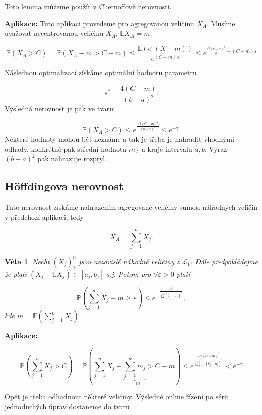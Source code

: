 \documentclass{article}
\newtheorem{theorem}[subsubsection]{Věta}
\theoremstyle{remark}
\theoremstyle{plain}
\theoremstyle{definition}
\theoremstyle{remark}
\begin{document}
Toto lemma můžeme použít v Chernoffově nerovnosti.

\textbf{Aplikace:}
Tuto aplikaci provedeme pro agregovanou veličinu $X_A$. Musíme uvažovat necentrovanou veličinu $X_A$, $\mathbb{E}X_A = m$.

$$
\mathbb{P}\left(X_A > C \right) = \mathbb{P}\left( X_A - m > C - m \right) \leq \frac{\mathbb{E} \left( e^s\left(X-m\right) \right)}{e^{\left(C-m\right)s}} \leq e^{\frac{s^2 \left(b-a\right)^2}{8} - \left(C-m\right)s}
$$

Následnou optimalizací získáme optimální hodnotu parametru

$$
s^{*} = \frac{4\left(C-m\right)}{\left(b-a\right)^2}.
$$
Výsledná nerovnost je pak ve tvaru

$$
\mathbb{P}\left(X_A > C \right) \leq e^{\frac{-2\left(C-m\right)^2}{\left(b-a\right)^2}} \leq e^{-\gamma}.
$$
Některé hodnoty mohou být neznáme a tak je třeba je nahradit vhodnými odhady, konkrétně pak střední hodnotu $\hat{m_A}$ a kraje intervalu $\hat{a}, \hat{b}$. Výraz $\left(b-a\right)^2$ pak nahrazuje rozptyl.

\subsection{H\"offdingova nerovnost}
Tuto nerovnost získáme nahrazením agregované veličiny sumou náhodných veličin v předchozí aplikaci, tedy

$$
X_A = \sum_{j=1}^n X_j.
$$

\begin{theorem}
Nechť $\left(X_j\right)_1^n$ jsou nezávislé náhodné veličiny z $\mathscr{L}_1$. Dále předpokládejme že platí $\left( X_j - \mathbb{E}X_j \right) \in \left[a_j,b_j\right]$ s.j. Potom pro $\forall \varepsilon > 0$ platí 

$$
\mathbb{P}\left(\sum_{j=1}^n X_j - m \geq \varepsilon \right) \leq e^{-\frac{2\varepsilon^2}{\sum \left(b_j-a_j\right)^2}},
$$
kde $m = \mathbb{E}\left(\sum_{j=1}^n X_j\right)$
\end{theorem}

\textbf{Aplikace:}

$$
\mathbb{P}\left(\sum_{j=1}^{n} X_j > C \right) = \mathbb{P}\left(\sum_{j=1}^{n} X_j - \underbrace{\sum_{j=1}^{n} m_j}_{=m} > C - m \right) \leq e^{\frac{-2\left(C-m\right)^2}{\sum_{j=1}^{n}\left(b_j-a_j\right)^2}} < e^{-\gamma}
$$

Opět je třeba odhadnout některé veličiny. Výsledné online řízení po sérii jednoduchých úprav dostaneme do tvaru
\end{document}
